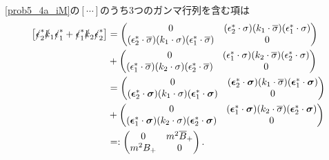 \eqref{prob5_4a_iM}の$[\cdots]$のうち3つのガンマ行列を含む項は
\begin{align*}
  \left[ \slashed{\epsilon}_2^\ast\slashed{k}_1\slashed{\epsilon}_1^\ast + \slashed{\epsilon}_1^\ast\slashed{k}_2\slashed{\epsilon}_2^\ast \right]
  & =
  \begin{pmatrix}
    0 & (\epsilon_2^\ast \cdot \sigma)(k_1 \cdot \overline\sigma)(\epsilon_1^\ast \cdot \sigma) \\
    (\epsilon_2^\ast \cdot \overline\sigma)(k_1 \cdot \sigma)(\epsilon_1^\ast \cdot \overline\sigma) & 0
  \end{pmatrix}
  \\
  & +
  \begin{pmatrix}
    0 & (\epsilon_1^\ast \cdot \sigma)(k_2 \cdot \overline\sigma)(\epsilon_2^\ast \cdot \sigma) \\
    (\epsilon_1^\ast \cdot \overline\sigma)(k_2 \cdot \sigma)(\epsilon_2^\ast \cdot \overline\sigma) & 0
  \end{pmatrix}
  \\
  &=
  \begin{pmatrix}
    0 & (\boldsymbol{\epsilon}_2^\ast \cdot \boldsymbol\sigma)(k_1 \cdot \overline\sigma)(\boldsymbol{\epsilon}_1^\ast \cdot \boldsymbol\sigma) \\
    (\boldsymbol{\epsilon}_2^\ast \cdot \boldsymbol\sigma)(k_1 \cdot \sigma)(\boldsymbol{\epsilon}_1^\ast \cdot \boldsymbol\sigma) & 0
  \end{pmatrix}
  \\
  & +
  \begin{pmatrix}
    0 & (\boldsymbol{\epsilon}_1^\ast \cdot \boldsymbol\sigma)(k_2 \cdot \overline\sigma)(\boldsymbol{\epsilon}_2^\ast \cdot \boldsymbol\sigma) \\
    (\boldsymbol{\epsilon}_1^\ast \cdot \boldsymbol\sigma)(k_2 \cdot \sigma)(\boldsymbol{\epsilon}_2^\ast \cdot \boldsymbol\sigma) & 0
  \end{pmatrix}
  \\
  &=:
  \begin{pmatrix}
    0 & m^2\overline{B}_+ \\
    m^2 B_+ & 0
  \end{pmatrix}
  .
\end{align*}

